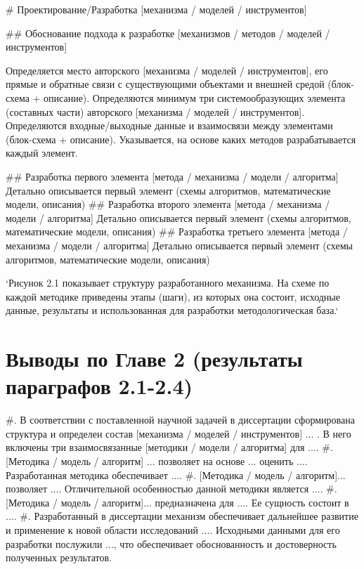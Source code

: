 # Проектирование/Разработка [механизма / моделей / инструментов]\label{ch:ch2}

## Обоснование подхода к разработке [механизмов / методов / моделей / инструментов]\label{sec:ch2/sect1}

Определяется место авторского [механизма / моделей / инструментов], его прямые и обратные связи с существующими объектами и внешней средой (блок-схема + описание). Определяются минимум три системообразующих элемента (составных части) авторского [механизма / моделей / инструментов]. Определяются входные/выходные данные и взаимосвязи между элементами (блок-схема + описание). Указывается, на основе каких методов разрабатывается каждый элемент.

## Разработка первого элемента [метода / механизма / модели / алгоритма]\label{sec:ch2/sect2}
Детально описывается первый элемент (схемы алгоритмов, математические модели, описания)
## Разработка второго элемента [метода / механизма / модели / алгоритма]\label{sec:ch2/sect3}
Детально описывается первый элемент (схемы алгоритмов, математические модели, описания)
## Разработка третьего элемента [метода / механизма / модели / алгоритма]\label{sec:ch2/sect4}
Детально описывается первый элемент (схемы алгоритмов, математические модели, описания)

`Рисунок 2.1 показывает структуру разработанного механизма. На схеме по каждой методике приведены этапы (шаги), из которых она состоит, исходные данные, результаты и использованная для разработки методологическая база.`

\section*{Выводы по Главе 2 (результаты параграфов 2.1-2.4)}

#. В соответствии с поставленной научной задачей в диссертации сформирована структура и определен состав [механизма / моделей / инструментов] ... . В него включены три взаимосвязанные [методики / модели / алгоритма] для ....
#. [Методика / модель / алгоритм] ... позволяет на основе ... оценить .... Разработанная методика обеспечивает ....
#. [Методика / модель / алгоритм]... позволяет .... Отличительной особенностью данной методики является ....
#. [Методика / модель / алгоритм]... предназначена для .... Ее сущность состоит в ....
#. Разработанный в диссертации механизм обеспечивает дальнейшее развитие и применение к новой области исследований .... Исходными данными для его разработки послужили ..., что обеспечивает обоснованность и достоверность полученных результатов.

\FloatBarrier
\clearpage